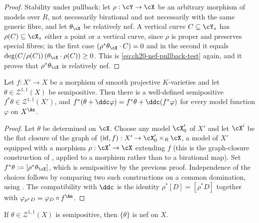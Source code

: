 \begin{proof}
Stability under pullback: let \(\rho:\cY\to\cX\) be an arbitrary morphism of
models over \(R\), not necessarily birational and not necessarily with the
same generic fibre, and let \(\theta_{\cX}\) be relatively nef.  A vertical
curve \(C\subseteq\cY_s\) has \(\rho(C)\subseteq\cX_s\) either a point or a
vertical curve, since \(\rho\) is proper and preserves special fibres; in
the first case \((\rho^*\theta_{\cX}\cdot C)=0\) and in the second it equals
\(\deg(C/\rho(C))\,(\theta_{\cX}\cdot\rho(C))\geq0\).  This is
\eqref{eq:ch20-nef-pullback-test} again, and it proves that
\(\rho^*\theta_{\cX}\) is relatively nef.
\end{proof}

\begin{corollary}
\label{cor:ch20-pullback-varieties}
Let \(f:X'\to X\) be a morphism of smooth projective \(K\)-varieties and let
\(\theta\in\mathcal Z^{1,1}(X)\) be semipositive.  Then there is a
well-defined semipositive \(f^*\theta\in\mathcal Z^{1,1}(X')\), and
\(f^*(\theta+\ddc\varphi)=f^*\theta+\ddc(f^*\varphi)\) for every model
function \(\varphi\) on \(X^{\An}\).
\end{corollary}

\begin{proof}
Let \(\theta\) be determined on \(\cX\).  Choose any model \(\cX'_0\) of
\(X'\) and let \(\cX'\) be the flat closure of the graph of
\((\mathrm{id},f):X'\to\cX'_0\times_R\cX\), a model of \(X'\) equipped with a
morphism \(\rho:\cX'\to\cX\) extending \(f\) (this is the graph-closure
construction of , applied to a morphism rather
than to a birational map).  Set \(f^*\theta:=[\rho^*\theta_{\cX}]\), which is
semipositive by the previous proof.  Independence of the choices follows by
comparing two such constructions on a common domination, using
.  The compatibility with \(\ddc\) is
the identity \(\rho^*[D]=[\rho^*D]\) together with
\(\varphi_{\rho^*D}=\varphi_D\circ f^{\An}\).
\end{proof}

\begin{corollary}
\label{cor:ch20-semipositive-generic-nef}
If \(\theta\in\mathcal Z^{1,1}(X)\) is semipositive, then \(\{\theta\}\) is nef on
\(X\).
\end{corollary}

